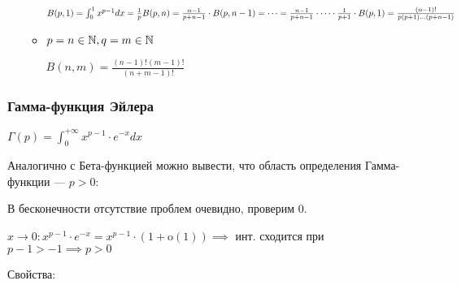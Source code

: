 \begin{enumerate}
\begin{itemize}
                    $
                        B(p, 1) = \int_0^1 x^{p - 1}dx = \frac{1}{p}
                        \\
                        B(p, n) = \frac{n - 1}{p + n - 1} \cdot B(p, n - 1) = \dots =
                        \frac{n-1}{p + n - 1} \cdot \dots \cdot \frac{1}{p + 1} \cdot B(p, 1) =
                        \frac{(n - 1)!}{p(p+1)\dots(p + n - 1)}
                    $
              \item $p = n \in \mathbb{N}, q = m \in \mathbb{N}$

                    $
                        B(n, m) = \frac{(n - 1)!(m - 1)!}{(n + m - 1)!}
                    $
          \end{itemize}

\end{enumerate}

\subsubsection{Гамма-функция Эйлера}

$\Gamma(p) = \int_0^{+\infty}x^{p - 1} \cdot e^{-x} dx$

Аналогично с Бета-функцией можно вывести, что область определения Гамма-функции ---
$p > 0$:

В бесконечности отсутствие проблем очевидно, проверим 0.

$x \to 0 \colon x^{p - 1} \cdot e^{-x} = x^{p - 1} \cdot (1 + \mathrm{o}(1))
    \implies$ инт. сходится при $p-1 > -1 \implies p > 0$

Свойства:

